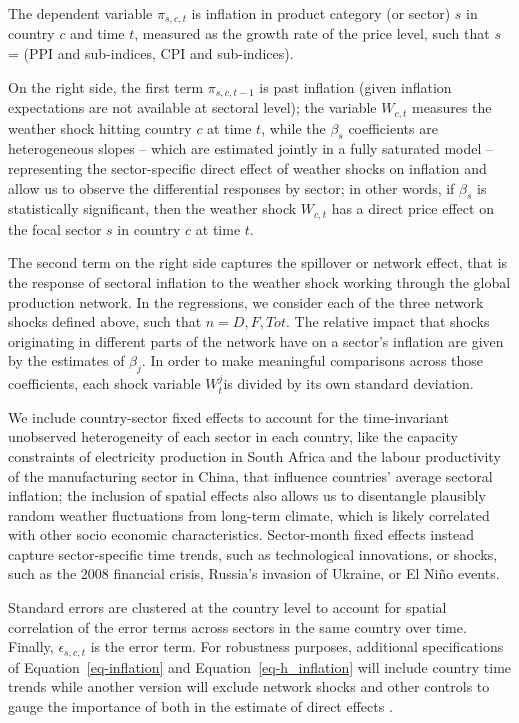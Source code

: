 \documentclass[
  letterpaper,
  DIV=11,
  numbers=noendperiod]{scrartcl}
\begin{document}
The dependent variable \(\pi_{s,c,t}\) is inflation in product category
(or sector) \(s\) in country \(c\) and time \(t\), measured as the
growth rate of the price level, such that \(s\) = (PPI and sub-indices,
CPI and sub-indices).

On the right side, the first term \(\pi_{s,c,t-1}\) is past inflation
(given inflation expectations are not available at sectoral level); the
variable \(W_{c,t}\) measures the weather shock hitting country \(c\) at
time \(t\), while the \(\beta_s\) coefficients are heterogeneous slopes
-- which are estimated jointly in a fully saturated model --
representing the sector-specific direct effect of weather shocks on
inflation and allow us to observe the differential responses by sector;
in other words, if \(\beta_s\) is statistically significant, then the
weather shock \(W_{c,t}\) has a direct price effect on the focal sector
\(s\) in country \(c\) at time \(t\).

The second term on the right side captures the spillover or network
effect, that is the response of sectoral inflation to the weather shock
working through the global production network. In the regressions, we
consider each of the three network shocks defined above, such that
\(n = 𝐷, F, 𝑇𝑜𝑡\). The relative impact that shocks originating in
different parts of the network have on a sector's inflation are given by
the estimates of \(\beta_j\). In order to make meaningful comparisons
across those coefficients, each shock variable \(W_t^j\)is divided by
its own standard deviation.

We include country-sector fixed effects to account for the
time-invariant unobserved heterogeneity of each sector in each country,
like the capacity constraints of electricity production in South Africa
and the labour productivity of the manufacturing sector in China, that
influence countries' average sectoral inflation; the inclusion of
spatial effects also allows us to disentangle plausibly random weather
fluctuations from long-term climate, which is likely correlated with
other socio economic characteristics. Sector-month fixed effects instead
capture sector-specific time trends, such as technological innovations,
or shocks, such as the 2008 financial crisis, Russia's invasion of
Ukraine, or El Niño events.

Standard errors are clustered at the country level to account for
spatial correlation of the error terms across sectors in the same
country over time. Finally, \(\epsilon_{s,c,t}\) is the error term. For
robustness purposes, additional specifications of
Equation~\ref{eq-inflation} and Equation~\ref{eq-h_inflation} will
include country time trends while another version will exclude network
shocks and other controls to gauge the importance of both in the
estimate of direct effects .
\end{document}
